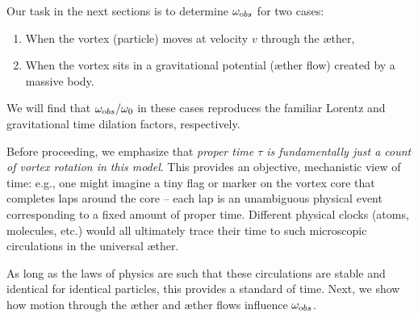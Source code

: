 Our task in the next sections is to determine $\omega_{\textrm obs}$ for two cases:
\begin{enumerate}
    \item When the vortex (particle) moves at velocity $v$ through the æther,
    \item When the vortex sits in a gravitational potential (æther flow) created by a massive body.
\end{enumerate}
We will find that $\omega_{\textrm obs}/\omega_0$ in these cases reproduces the familiar Lorentz and gravitational time dilation factors, respectively.

Before proceeding, we emphasize that \emph{proper time $\tau$ is fundamentally just a count of vortex rotation in this model}. This provides an objective, mechanistic view of time: e.g., one might imagine a tiny flag or marker on the vortex core that completes laps around the core – each lap is an unambiguous physical event corresponding to a fixed amount of proper time. Different physical clocks (atoms, molecules, etc.) would all ultimately trace their time to such microscopic circulations in the universal æther.

As long as the laws of physics are such that these circulations are stable and identical for identical particles, this provides a standard of time. Next, we show how motion through the æther and æther flows influence $\omega_{\textrm obs}$.
